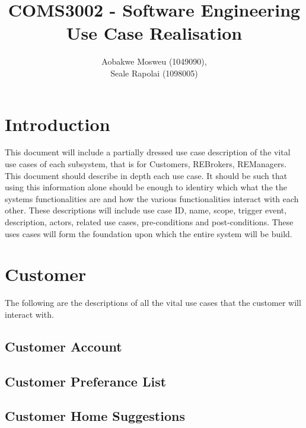 \documentclass[11pt]{article}
\begin{document}
	\title{
		COMS3002 - Software Engineering\\
		\large Use Case Realisation
	}
	\author{Aobakwe Mosweu (1049090), \\Seale Rapolai (1098005)}
	\maketitle
	
	\clearpage
	\tableofcontents
	\clearpage
	
	\section{Introduction}
	\begin{flushleft}
		This document will include a partially dressed use case description of the vital use cases of each subsystem, that is for Customers, REBrokers, REManagers. This document should describe in depth each use case. It should be such that using this information alone should be enough to identiry which what the the systems functionalities are and how the various functionalities interact with each other. These descriptions will include use case ID, name, scope, trigger event, description, actors, related use cases, pre-conditions and post-conditions. These uses cases will form the foundation upon which the entire system will be build.
	\end{flushleft}
	
	\section{Customer}
	\begin{flushleft}
		The following are the descriptions of all the vital use cases that the customer will interact with. 
	\end{flushleft}
	
		\subsection{Customer Account}
		
		\subsection{Customer Preferance List}
		
		\subsection{Customer Home Suggestions}
		
\end{document}
